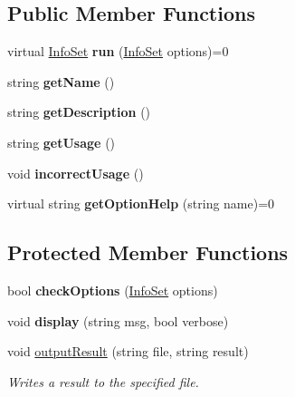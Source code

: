 \subsection*{Public Member Functions}
\begin{DoxyCompactItemize}
\item 
\hypertarget{classpct_1_1_tool_a90adc8a035ba612fa866f7fa9599091e}{virtual \hyperlink{classpct_1_1_info_set}{Info\-Set} {\bfseries run} (\hyperlink{classpct_1_1_info_set}{Info\-Set} options)=0}\label{classpct_1_1_tool_a90adc8a035ba612fa866f7fa9599091e}

\item 
\hypertarget{classpct_1_1_tool_a292c57bb278c6cb396e0b98fdb430da6}{string {\bfseries get\-Name} ()}\label{classpct_1_1_tool_a292c57bb278c6cb396e0b98fdb430da6}

\item 
\hypertarget{classpct_1_1_tool_a08c4e95312d0b982ef08423a161435bf}{string {\bfseries get\-Description} ()}\label{classpct_1_1_tool_a08c4e95312d0b982ef08423a161435bf}

\item 
\hypertarget{classpct_1_1_tool_aa0d906602390db5ee0a734e38a076319}{string {\bfseries get\-Usage} ()}\label{classpct_1_1_tool_aa0d906602390db5ee0a734e38a076319}

\item 
\hypertarget{classpct_1_1_tool_ab440971d238b60c0afd84722fa748489}{void {\bfseries incorrect\-Usage} ()}\label{classpct_1_1_tool_ab440971d238b60c0afd84722fa748489}

\item 
\hypertarget{classpct_1_1_tool_ab5f2fddae73cd3466b6230ef78074666}{virtual string {\bfseries get\-Option\-Help} (string name)=0}\label{classpct_1_1_tool_ab5f2fddae73cd3466b6230ef78074666}

\end{DoxyCompactItemize}
\subsection*{Protected Member Functions}
\begin{DoxyCompactItemize}
\item 
\hypertarget{classpct_1_1_tool_a4be774ffb66509ce3324fd067a0141a6}{bool {\bfseries check\-Options} (\hyperlink{classpct_1_1_info_set}{Info\-Set} options)}\label{classpct_1_1_tool_a4be774ffb66509ce3324fd067a0141a6}

\item 
\hypertarget{classpct_1_1_tool_a191caafe159a31f7decb46cbe3f2fe3f}{void {\bfseries display} (string msg, bool verbose)}\label{classpct_1_1_tool_a191caafe159a31f7decb46cbe3f2fe3f}

\item 
\hypertarget{classpct_1_1_tool_a079e22dd0beb78aeb831ebd6622d5e83}{void \hyperlink{classpct_1_1_tool_a079e22dd0beb78aeb831ebd6622d5e83}{output\-Result} (string file, string result)}\label{classpct_1_1_tool_a079e22dd0beb78aeb831ebd6622d5e83}

\begin{DoxyCompactList}\small\item\em Writes a result to the specified file. \end{DoxyCompactList}\end{DoxyCompactItemize}
